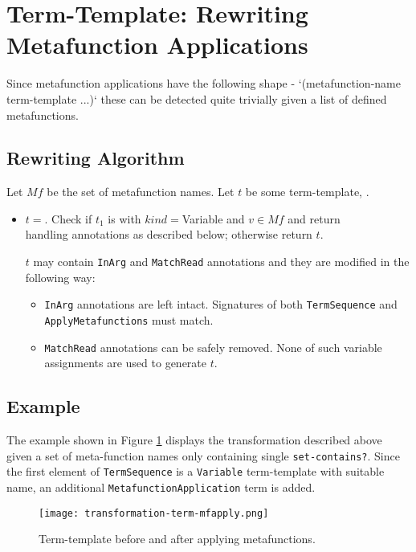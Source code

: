 \section{Term-Template: Rewriting Metafunction Applications}

Since metafunction applications have the following shape - `(metafunction-name term-template ...)` these can be detected quite trivially given a list of defined metafunctions. 

\subsection{Rewriting Algorithm}
Let $Mf$ be the set of metafunction names. Let $t$ be some term-template, . 
\begin{itemize}
\item $t=$\TermSequence. Check if $t_1$ is \TermLiteral with $kind=$Variable and $v \in Mf$ and return \\ \ApplyMetafunction[$v$][$t$][false] handling annotations as described below; otherwise return $t$. 

$t$ may contain \texttt{InArg} and \texttt{MatchRead} annotations and they are modified in the following way:
\begin{itemize}
\item
\texttt{InArg} annotations are left intact. Signatures of both \texttt{TermSequence} and \texttt{ApplyMetafunctions} must match.
\item
\texttt{MatchRead} annotations can be safely removed. None of such variable assignments are used to generate $t$.
\end{itemize}
\end{itemize}
\subsection{Example}
The example shown in Figure \ref{transformation-term-mfapply} displays the transformation described above given a set of meta-function names only containing single \texttt{set-contains?}. Since the first element of \texttt{TermSequence} is a \texttt{Variable} term-template with suitable name, an additional \texttt{MetafunctionApplication} term is added.

\begin{figure}[H]
\texttt{[image: transformation-term-mfapply.png]}
\caption{Term-template before and after applying metafunctions.}
\label{transformation-term-mfapply}
\end{figure}
